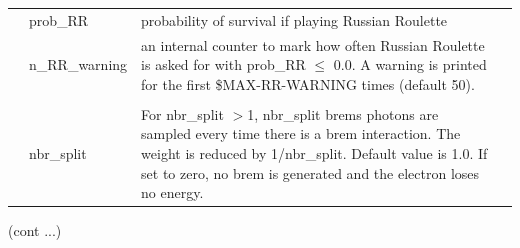 \begin{table}[htb]
\begin{center}
\begin{tabular}{ l l   p{105mm}l  |}
	& prob\_RR & probability of survival if playing Russian Roulette\\
	& n\_RR\_warning & an internal counter to mark how often Russian
	Roulette is asked for with prob\_RR $\le$ 0.0. A warning is printed
       for the first \$MAX-RR-WARNING times (default 50).\\
&&\\
	&nbr\_split& For nbr\_split $>$1, nbr\_split brems photons are
sampled {every time} there is a brem interaction. The weight is reduced by
1/nbr\_split. Default value is 1.0.  If set to zero, no brem is generated
and the electron loses no energy.\\
\hline
    \end{tabular}
    \end{center}
    \mbox{}\hfill (cont ...)\\
    \end{table}
    \clearpage

